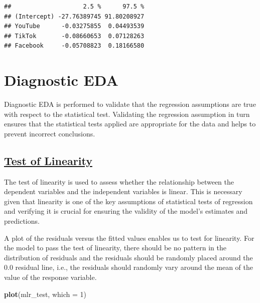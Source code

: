 \documentclass[
]{article}
\newenvironment{Shaded}{\begin{snugshade}}{\end{snugshade}}
\newcommand{\AttributeTok}[1]{\textcolor[rgb]{0.13,0.29,0.53}{#1}}
\newcommand{\DecValTok}[1]{\textcolor[rgb]{0.00,0.00,0.81}{#1}}
\newcommand{\FunctionTok}[1]{\textcolor[rgb]{0.13,0.29,0.53}{\textbf{#1}}}
\newcommand{\NormalTok}[1]{#1}
\begin{document}
\begin{verbatim}
##                    2.5 %      97.5 %
## (Intercept) -27.76389745 91.80208927
## YouTube      -0.03275855  0.04493539
## TikTok       -0.08660653  0.07128263
## Facebook     -0.05708823  0.18166580
\end{verbatim}

\section{Diagnostic EDA}\label{diagnostic-eda}

Diagnostic EDA is performed to validate that the regression assumptions
are true with respect to the statistical test. Validating the regression
assumption in turn ensures that the statistical tests applied are
appropriate for the data and helps to prevent incorrect conclusions.

\subsection{\texorpdfstring{\ul{\textbf{Test of
Linearity}}}{Test of Linearity}}\label{test-of-linearity}

The test of linearity is used to assess whether the relationship between
the dependent variables and the independent variables is linear. This is
necessary given that linearity is one of the key assumptions of
statistical tests of regression and verifying it is crucial for ensuring
the validity of the model's estimates and predictions.

A plot of the residuals versus the fitted values enables us to test for
linearity. For the model to pass the test of linearity, there should be
no pattern in the distribution of residuals and the residuals should be
randomly placed around the 0.0 residual line, i.e., the residuals should
randomly vary around the mean of the value of the response variable.

\begin{Shaded}
\begin{Highlighting}[]
\FunctionTok{plot}\NormalTok{(mlr\_test, }\AttributeTok{which =} \DecValTok{1}\NormalTok{)}
\end{Highlighting}
\end{Shaded}
\end{document}
